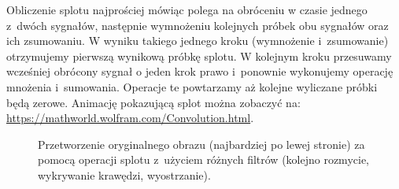 Obliczenie splotu najprościej mówiąc polega na obróceniu w czasie jednego z~dwóch sygnałów, następnie wymnożeniu kolejnych próbek obu sygnałów oraz ich zsumowaniu. W wyniku takiego jednego kroku (wymnożenie i~zsumowanie) otrzymujemy pierwszą wynikową próbkę splotu. W kolejnym kroku przesuwamy wcześniej obrócony sygnał o jeden krok prawo i~ponownie wykonujemy operację mnożenia i~sumowania. Operacje te powtarzamy aż kolejne wyliczane próbki będą zerowe. Animację pokazującą splot można zobaczyć na: \url{https://mathworld.wolfram.com/Convolution.html}.

\begin{figure}
	\centering
	\caption{Przetworzenie oryginalnego obrazu (najbardziej po lewej stronie) za pomocą operacji splotu z~użyciem różnych filtrów (kolejno rozmycie, wykrywanie krawędzi, wyostrzanie).}
	\label{lab1/fig/imageFiltering}
\end{figure}

